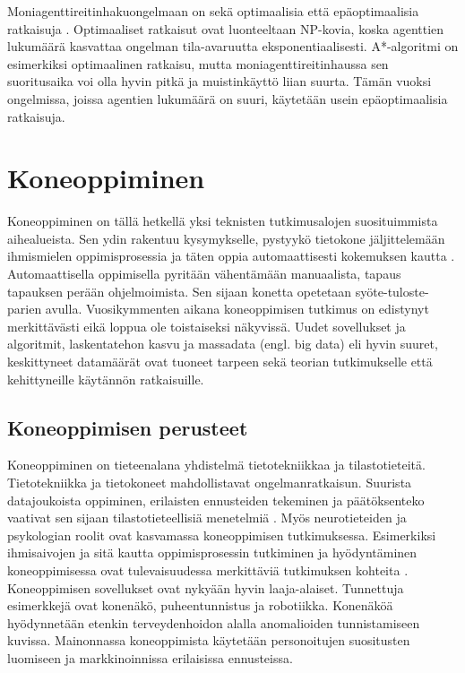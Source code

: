 \documentclass[utf8]{gradu3}
\begin{document}
Moniagenttireitinhakuongelmaan on sekä optimaalisia että epäoptimaalisia ratkaisuja \parencite{sharon2015conflict}. Optimaaliset ratkaisut ovat luonteeltaan NP-kovia, koska agenttien lukumäärä kasvattaa ongelman tila-avaruutta eksponentiaalisesti. A*-algoritmi on esimerkiksi optimaalinen ratkaisu, mutta moniagenttireitinhaussa sen suoritusaika voi olla hyvin pitkä ja muistinkäyttö liian suurta. Tämän vuoksi ongelmissa, joissa agentien lukumäärä on suuri, käytetään usein epäoptimaalisia ratkaisuja.

\chapter{Koneoppiminen}
\label{koneoppiminen}

Koneoppiminen on tällä hetkellä yksi teknisten tutkimusalojen suosituimmista aihealueista. Sen ydin rakentuu kysymykselle, pystyykö tietokone jäljittelemään ihmismielen oppimisprosessia ja täten oppia automaattisesti kokemuksen kautta \parencite{das2017survey,jordan2015machine}. Automaattisella oppimisella pyritään vähentämään manuaalista, tapaus tapauksen perään ohjelmoimista. Sen sijaan konetta opetetaan syöte-tuloste-parien avulla. Vuosikymmenten aikana koneoppimisen tutkimus on edistynyt merkittävästi eikä loppua ole toistaiseksi näkyvissä. Uudet sovellukset ja algoritmit, laskentatehon kasvu ja massadata (engl. big data) eli hyvin suuret, keskittyneet datamäärät ovat tuoneet tarpeen sekä teorian tutkimukselle että kehittyneille käytännön ratkaisuille.

\section{Koneoppimisen perusteet}

Koneoppiminen on tieteenalana yhdistelmä tietotekniikkaa ja tilastotieteitä. Tietotekniikka ja tietokoneet mahdollistavat ongelmanratkaisun. Suurista datajoukoista oppiminen, erilaisten ennusteiden tekeminen ja päätöksenteko vaativat sen sijaan tilastotieteellisiä menetelmiä \parencite{das2017survey,jordan2015machine}. Myös neurotieteiden ja psykologian roolit ovat kasvamassa koneoppimisen tutkimuksessa. Esimerkiksi ihmisaivojen ja sitä kautta oppimisprosessin tutkiminen ja hyödyntäminen koneoppimisessa ovat tulevaisuudessa merkittäviä tutkimuksen kohteita \parencite{das2017survey}. Koneoppimisen sovellukset ovat nykyään hyvin laaja-alaiset. Tunnettuja esimerkkejä ovat konenäkö, puheentunnistus ja robotiikka. Konenäköä hyödynnetään etenkin terveydenhoidon alalla anomalioiden tunnistamiseen kuvissa. Mainonnassa koneoppimista käytetään personoitujen suositusten luomiseen ja markkinoinnissa erilaisissa ennusteissa.
\end{document}
